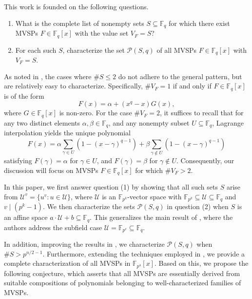 \documentclass[11pt]{amsart}
\theoremstyle{definition}
\theoremstyle{remark}
\begin{document}
This work is founded on the following questions.


\begin{enumerate}[\rm(1)]
\item What is the complete list of nonempty sets $S \subseteq \mathbb{F}_q$ for which there exist  MVSPs  $F \in \mathbb{F}_q[x]$ with the value set $V_F=S$?
\item For each such $S$, characterize the set $\mathcal{P}(S, q)$ of all MVSPs $F \in \mathbb{F}_q[x]$ with $V_F=S$.
\end{enumerate}

As noted in \cite{Carlitz}, the cases where $\# S \leq 2$ do not adhere to the general pattern, but are relatively easy to characterize. Specifically, $\# V_F=1$ if and only if $F \in \mathbb{F}_q[x]$ is of the form
$$
F(x)=\alpha+\left(x^q-x\right) G(x),
$$
where $G \in \mathbb{F}_q[x]$ is non-zero. For the case $\# V_F=2$, it suffices to recall that for any two distinct elements $\alpha, \beta \in \mathbb{F}_q$, and any nonempty subset $U \subseteq \mathbb{F}_q$, Lagrange interpolation yields the unique polynomial
$$
F(x)=\alpha \sum_{\gamma \in U}\left(1-(x-\gamma)^{q-1}\right)+\beta \sum_{\gamma \notin U}\left(1-(x-\gamma)^{q-1}\right)
$$
satisfying $F(\gamma)=\alpha$ for $\gamma \in U$, and $F(\gamma)=\beta$ for $\gamma \notin U$. Consequently, our discussion will focus on MVSPs $F \in \mathbb{F}_q[x]$ for which $\# V_F>2$.

In this paper, we first answer question (1) by showing that all such sets $S$ arise from $\mathcal{U}^v = \{u^v : u \in \mathcal{U}\}$, where $\mathcal{U}$ is an $\mathbb{F}_{p^k}$-vector space with $\mathbb{F}_{p^k} \subseteq \mathcal{U}   \subseteq  \mathbb{F}_q$ and $v \mid (p^k - 1)$. We then characterize the sets $\mathcal{P}(S, q)$ in question (2) when $S$  is an affine space $a \cdot \mathcal{U} + b \subseteq  \mathbb{F}_q$.
This generalizes the main result of \cite{Bor2}, where the authors address the subfield  case  $\mathcal{U}=\mathbb{F}_{p^e} \subseteq  \mathbb{F}_q$.
%
%
%
%

In addition, improving the results in \cite{Mills}, we characterize $\mathcal{P}(S, q)$ when $\# S>p^{n / 2-1}$. Furthermore, extending the techniques employed in \cite{BR}, we provide a complete characterization of all MVSPs in $\mathbb{F}_{p^4}[x]$. Based on this, we propose the following conjecture, which asserts that all MVSPs are essentially derived from suitable compositions of polynomials belonging to well-characterized families of MVSPs.
\end{document}
